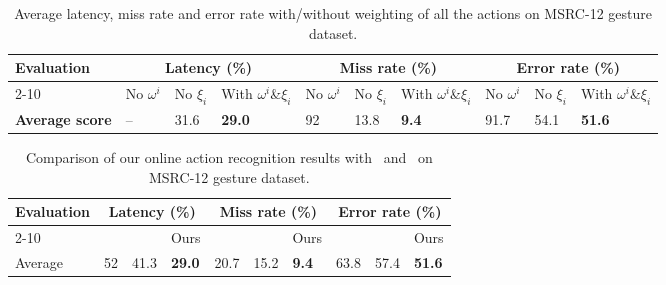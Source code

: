 \documentclass[sigconf]{acmart}
\begin{document}
\begin{table*}[!htb]
\caption{Average latency, miss rate and error rate with/without weighting of all the actions on MSRC-12 gesture dataset.}
\label{LMRResultsMSRC-12Weight}\centering
\begin{tabular}{|p{3.0cm}<{\centering}|p{0.6cm}<{\centering}|p{0.6cm}<{\centering}|p{1.0cm}<{\centering}|p{0.6cm}<{\centering}|p{0.6cm}<{\centering}|p{1.0cm}<{\centering}|p{0.6cm}<{\centering}|p{0.6cm}<{\centering}|p{1.0cm}<{\centering}|}
\hline
\multirow{2}{*}{Evaluation} & \multicolumn{3}{c|}{Latency (\%)} & \multicolumn{3}{c|}{Miss rate (\%)} & \multicolumn{3}{c|}{Error rate (\%)}\\
\cline{2-10}
& No $\omega^i$ & No $\xi_i$ & With $\omega^i$\&$\xi_i$ & No $\omega^i$ & No $\xi_i$ & With $\omega^i$\&$\xi_i$ & No $\omega^i$ & No $\xi_i$ & With $\omega^i$\&$\xi_i$ \\
\hline
\textbf{Average score} &  --   &  31.6    & \textbf{29.0 }& 92 &  13.8   &  \textbf{9.4} &  91.7    & 54.1 &     \textbf{51.6}\\
\hline
\end{tabular}
\end{table*}

\begin{table*}[!htbp]
\caption{Comparison of our online action recognition results with~\cite{kviatkovsky2014online} and~\cite{hussein2013human} on  MSRC-12 gesture dataset.}
\label{LMRResultsMSRC12Compare}\centering
\begin{tabular}{|p{1.6cm}<{\centering}|p{0.5cm}<{\centering}|p{0.5cm}<{\centering}|p{0.6cm}<{\centering}|p{0.5cm}<{\centering}|p{0.5cm}<{\centering}|p{0.6cm}<{\centering}|p{0.5cm}<{\centering}|p{0.5cm}<{\centering}|p{0.6cm}<{\centering}|}
\hline
\multirow{3}{*}{Evaluation} & \multicolumn{3}{c|}{Latency (\%)} & \multicolumn{3}{c|}{Miss rate (\%)} & \multicolumn{3}{c|}{Error rate (\%)}\\
\cline{2-10}
& \cite{kviatkovsky2014online} & \cite{hussein2013human} & Ours & \cite{kviatkovsky2014online} & \cite{hussein2013human} & Ours & \cite{kviatkovsky2014online} & \cite{hussein2013human} & Ours \\
\hline
Average & 52 & 41.3 & \textbf{29.0}  & 20.7 & 15.2 &  \textbf{9.4} & 63.8 & 57.4 & \textbf{51.6}\\
\hline
\end{tabular}
\end{table*}
\end{document}
